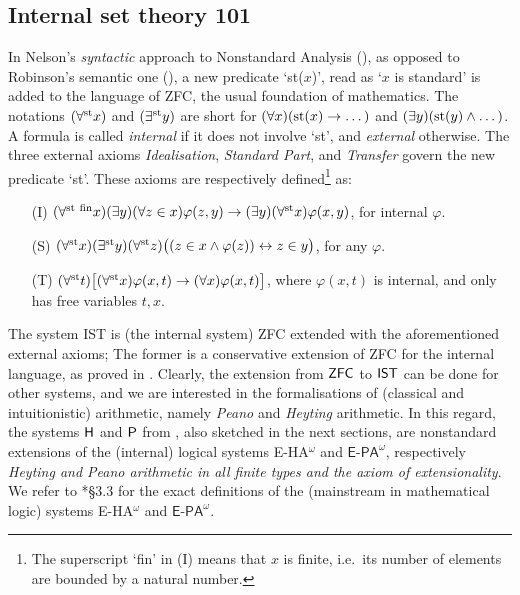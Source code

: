 \documentclass[reqno]{amsart}
\def\H{\textup{\textsf{H}}}
\def\P{\textup{\textsf{P}}}
\def\st{\textup{st}}
\def\asa{\leftrightarrow}
\def\di{\rightarrow}
\def\ZFC{\textup{\textsf{ZFC}}}
\def\IST{\textup{\textsf{IST}}}
\numberwithin{equation}{section}
\numberwithin{thm}{section}
\begin{document}
\subsection{Internal set theory 101}\label{IIST}
In Nelson's \emph{syntactic} approach to Nonstandard Analysis (\cite{wownelly}), as opposed to Robinson's semantic one (\cite{robinson1}), a new predicate `st($x$)', read as `$x$ is standard' is added to the language of \textsf{ZFC}, the usual foundation of mathematics.  
The notations $(\forall^{\st}x)$ and $(\exists^{\st}y)$ are short for $(\forall x)(\st(x)\di \dots)$ and $(\exists y)(\st(y)\wedge \dots)$.  A formula is called \emph{internal} if it does not involve `st', and \emph{external} otherwise.   
The three external axioms \emph{Idealisation}, \emph{Standard Part}, and \emph{Transfer} govern the new predicate `st'.  These axioms are respectively defined\footnote{The superscript `fin' in \textsf{(I)} means that $x$ is finite, i.e.\ its number of elements are bounded by a natural number.} as:  
\begin{enumerate}
\item[\textsf{(I)}] $(\forall^{\st~\textup{fin}}x)(\exists y)(\forall z\in x)\varphi(z,y)\di (\exists y)(\forall^{\st}x)\varphi(x,y)$, for internal $\varphi$.
\item[\textsf{(S)}] $(\forall^{\st} x)(\exists^{\st}y)(\forall^{\st}z)\big((z\in x\wedge \varphi(z))\asa z\in y\big)$, for any $\varphi$.
\item[\textsf{(T)}] $(\forall^{\st}t)\big[(\forall^{\st}x)\varphi(x, t)\di (\forall x)\varphi(x, t)\big]$, where $\varphi(x,t)$ is internal, and only has free variables $t, x$.  %
\end{enumerate}
The system \textsf{IST} is (the internal system) \textsf{ZFC} extended with the aforementioned external axioms;  
The former is a conservative extension of \textsf{ZFC} for the internal language, as proved in \cite{wownelly}.    %
Clearly, the extension from $\ZFC$ to $\IST$ can be done for other systems, and we are interested in the formalisations of (classical and intuitionistic) arithmetic, namely \emph{Peano} and \emph{Heyting} arithmetic.  In this regard, the systems $\H$ and $\P$ from \cite{brie}, also sketched in the next sections, are nonstandard extensions of the (internal) logical systems \textsf{E-HA}$^{\omega}$ and $\textsf{E-PA}^{\omega}$, respectively \emph{Heyting and Peano arithmetic in all finite types and the axiom of extensionality}.       
We refer to \cite{kohlenbach3}*{\S3.3} for the exact definitions of the (mainstream in mathematical logic) systems \textsf{E-HA}$^{\omega}$ and $\textsf{E-PA}^{\omega}$.  \
%
%
\end{document}
